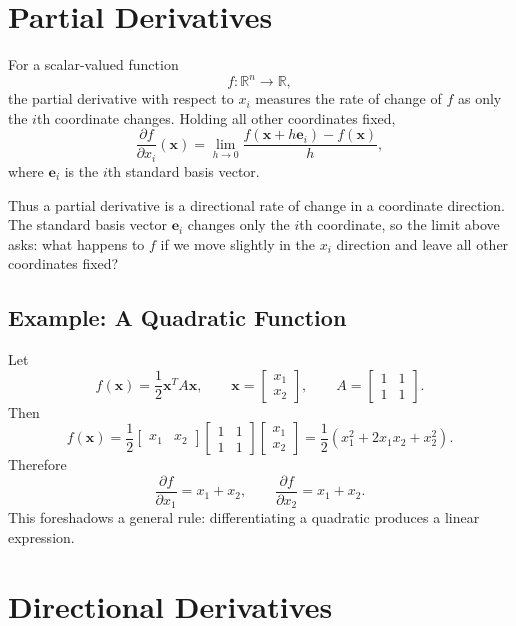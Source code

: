 \section{Partial Derivatives}
\label{mf:partial-derivatives}

For a scalar-valued function
\[
    f:\mathbb{R}^n\to\mathbb{R},
\]
the partial derivative with respect to \(x_i\) measures the rate of change of \(f\) as only the \(i\)th coordinate changes. Holding all other coordinates fixed,
\[
    \frac{\partial f}{\partial x_i}(\mathbf{x})
    =\lim_{h\to 0}\frac{f(\mathbf{x}+h\mathbf{e}_i)-f(\mathbf{x})}{h},
\]
where \(\mathbf{e}_i\) is the \(i\)th standard basis vector.

Thus a partial derivative is a directional rate of change in a coordinate direction. The standard basis vector \(\mathbf{e}_i\) changes only the \(i\)th coordinate, so the limit above asks: what happens to \(f\) if we move slightly in the \(x_i\) direction and leave all other coordinates fixed?

\subsection*{Example: A Quadratic Function}

Let
\[
    f(\mathbf{x})=\frac{1}{2}\mathbf{x}^T A\mathbf{x},
    \qquad
    \mathbf{x}=\begin{bmatrix}x_1\\x_2\end{bmatrix},
    \qquad
    A=\begin{bmatrix}1&1\\1&1\end{bmatrix}.
\]
Then
\[
    f(\mathbf{x})
    =\frac{1}{2}
    \begin{bmatrix}x_1&x_2\end{bmatrix}
    \begin{bmatrix}1&1\\1&1\end{bmatrix}
    \begin{bmatrix}x_1\\x_2\end{bmatrix}
    =\frac{1}{2}(x_1^2+2x_1x_2+x_2^2).
\]
Therefore
\[
    \frac{\partial f}{\partial x_1}=x_1+x_2,
    \qquad
    \frac{\partial f}{\partial x_2}=x_1+x_2.
\]
This foreshadows a general rule: differentiating a quadratic produces a linear expression.

\section{Directional Derivatives}
\label{mf:directional-derivatives}

